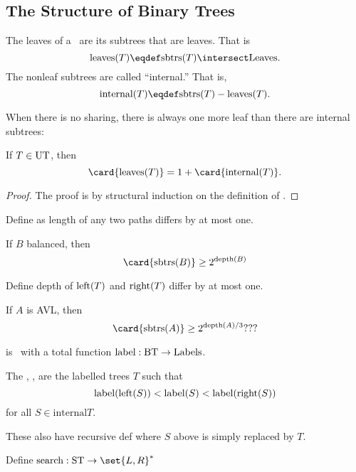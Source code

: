 \iffalse
Now we can replace the `$\leq$'' in the proof of
Lemma~\ref{lem:finsubtrees}, namely,
\[
\card{\subtrees{T}} = 1 + \card{\subtrees{leftsub{T}}} + \card{\subtrees{leftsub{T}}}.
\]
for all $T \in \ubt$.
\fi

\subsection{The Structure of Binary Trees}

The leaves of a \rectree\ are its subtrees that are leaves.  That is
\[
\text{leaves}(T) \eqdef \subtrees{T} \intersect \leafset.
\]
The nonleaf subtrees are called ``internal.''  That is,
\[
\text{internal}(T) \eqdef \subtrees{T} - \text{leaves}(T).
\]

When there is no sharing, there is always one more leaf than there are
internal subtrees:

\begin{lemma}\label{}
If $T \in \ubt$, then
\[
\card{\text{leaves}(T)} = 1 + \card{\text{internal}(T)}.
\]
\end{lemma}
\begin{proof}
The proof is by structural induction on the definition of \ubt.

\end{proof} 

Define  as length of any two paths differs by at
most one.

\begin{lemma}\label{}
If $B$ balanced, then
\[
\card{\subtrees{B}} \geq 2^{\text{depth}(B)}
\]
\end{lemma}

Define  depth of $\text{left}(T)$ and $\text{right}(T)$
differ by at most one.

\begin{lemma}\label{}
If $A$ is AVL, then
\[
\card{\subtrees{A}} \geq 2^{\text{depth}(A)/3}???
\]
\end{lemma}

\begin{definition}
 is \bintree\ with a total function
$\text{label}:\text{BT} \to \text{Labels}$.

The , \Searcht, are the labelled trees $T$ such that
\[
\text{label}(\text{left}(S)) < \text{label}(S) < \text{label}(\text{right}(S))
\]
for all $S \in \text{internal}{T}$.
\end{definition}

These also have recursive def where $S$ above is simply replaced by
$T$.

Define $\text{search}: \Searcht \to \set{L,R}^*$


  \endinput
